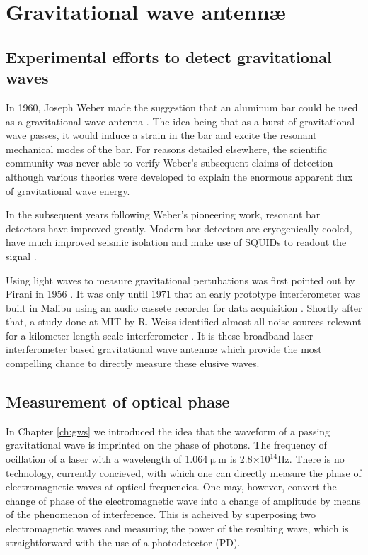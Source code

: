 \chapter{Gravitational wave antenn\ae{}}

\section{Experimental efforts to detect gravitational waves}
In 1960, Joseph Weber made the suggestion that an aluminum bar could be used as a gravitational wave antenna \cite{bar1}. %
The idea being that as a burst of gravitational wave passes, it would induce a strain in the bar and excite the resonant mechanical modes of the bar. %
For reasons detailed elsewhere\cite{bar2,bar3}, the scientific community was never able to verify Weber's subsequent claims of detection\cite{bar4} although various theories\cite{bar5,bar6} were developed to explain the enormous apparent flux of gravitational wave energy.

In the subsequent years following Weber’s pioneering work, resonant bar detectors have improved greatly. %
Modern bar detectors are cryogenically cooled, have much improved seismic isolation and make use of SQUIDs to readout the signal \cite{bar7}.

Using light waves to measure gravitational pertubations was first pointed out by Pirani in 1956 \cite{ifo1}. %
It was only until 1971 that an early prototype interferometer was built in Malibu using an audio cassete recorder for data acquisition \cite{ifo2}. %
Shortly after that, a study done at MIT by R. %
Weiss identified almost all noise sources relevant for a kilometer length scale interferometer \cite{ifo3}. %
It is these broadband laser interferometer based gravitational wave antenn\ae{} which provide the most compelling chance to directly measure these elusive waves.

\section{Measurement of optical phase}
In Chapter \ref{ch:gws} we introduced the idea that the waveform of a passing gravitational wave is imprinted on the phase of photons. %
The frequency of ocillation of a laser with a wavelength of 1.064$\upmu$m is 2.8$\times 10^{14}$Hz. %
There is no technology, currently concieved, with which one can directly measure the phase of electromagnetic waves at optical frequencies. %
One may, however, convert the change of phase of the electromagnetic wave into a change of amplitude by means of the phenomenon of interference. %
This is acheived by superposing two electromagnetic waves and measuring the power of the resulting wave, which is straightforward with the use of a photodetector (PD). %


